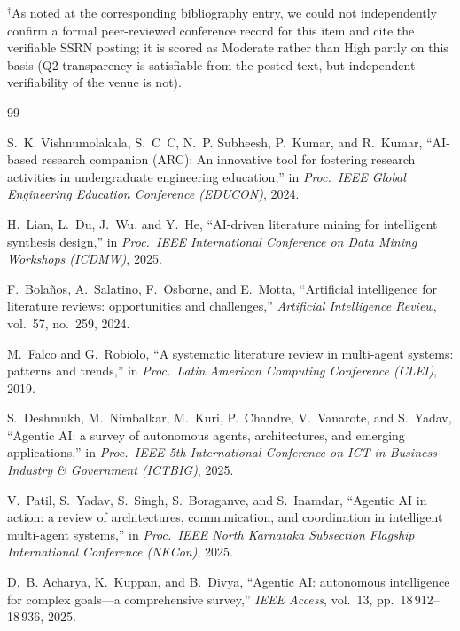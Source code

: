 \documentclass[sn-basic,Numbered]{sn-jnl}
\begin{document}
\noindent$^{\dagger}$As noted at the corresponding bibliography entry,
we could not independently confirm a formal peer-reviewed conference
record for this item and cite the verifiable SSRN posting; it is
scored as Moderate rather than High partly on this basis (Q2
transparency is satisfiable from the posted text, but independent
verifiability of the venue is not).

\begin{thebibliography}{99}

S.~K. Vishnumolakala, S.~C~C, N.~P. Subheesh, P.~Kumar, and R.~Kumar,
``AI-based research companion (ARC): An innovative tool for fostering
research activities in undergraduate engineering education,''
in \emph{Proc.\ IEEE Global Engineering Education Conference
(EDUCON)}, 2024.

H.~Lian, L.~Du, J.~Wu, and Y.~He,
``AI-driven literature mining for intelligent synthesis design,''
in \emph{Proc.\ IEEE International Conference on Data Mining
Workshops (ICDMW)}, 2025.

F.~Bola\~nos, A.~Salatino, F.~Osborne, and E.~Motta,
``Artificial intelligence for literature reviews: opportunities and
challenges,''
\emph{Artificial Intelligence Review}, vol.~57, no.~259, 2024.

M.~Falco and G.~Robiolo,
``A systematic literature review in multi-agent systems: patterns and
trends,''
in \emph{Proc.\ Latin American Computing Conference (CLEI)}, 2019.

S.~Deshmukh, M.~Nimbalkar, M.~Kuri, P.~Chandre, V.~Vanarote, and
S.~Yadav,
``Agentic AI: a survey of autonomous agents, architectures, and
emerging applications,''
in \emph{Proc.\ IEEE 5th International Conference on ICT in Business
Industry \& Government (ICTBIG)}, 2025.

V.~Patil, S.~Yadav, S.~Singh, S.~Boraganve, and S.~Inamdar,
``Agentic AI in action: a review of architectures, communication, and
coordination in intelligent multi-agent systems,''
in \emph{Proc.\ IEEE North Karnataka Subsection Flagship
International Conference (NKCon)}, 2025.

D.~B. Acharya, K.~Kuppan, and B.~Divya,
``Agentic AI: autonomous intelligence for complex goals---a
comprehensive survey,''
\emph{IEEE Access}, vol.~13, pp.~18\,912--18\,936, 2025.


\end{thebibliography}
\end{document}
